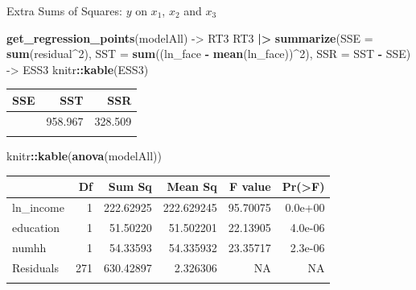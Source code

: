 \documentclass[
  ignorenonframetext,
]{beamer}
\newenvironment{Shaded}{\begin{snugshade}}{\end{snugshade}}
\newcommand{\AttributeTok}[1]{\textcolor[rgb]{0.13,0.29,0.53}{#1}}
\newcommand{\DecValTok}[1]{\textcolor[rgb]{0.00,0.00,0.81}{#1}}
\newcommand{\FunctionTok}[1]{\textcolor[rgb]{0.13,0.29,0.53}{\textbf{#1}}}
\newcommand{\NormalTok}[1]{#1}
\newcommand{\OtherTok}[1]{\textcolor[rgb]{0.56,0.35,0.01}{#1}}
\newcommand{\SpecialCharTok}[1]{\textcolor[rgb]{0.81,0.36,0.00}{\textbf{#1}}}
\begin{document}
\begin{frame}[fragile]{Extra Sums of Squares: \(y\) on \(x_1\), \(x_2\)
and \(x_3\)}
\label{extra-sums-of-squares-y-on-x_1-x_2-and-x_3-1}
\normalsize

\begin{Shaded}
\begin{Highlighting}[]
\FunctionTok{get\_regression\_points}\NormalTok{(modelAll) }\OtherTok{{-}\textgreater{}}\NormalTok{ RT3}
\NormalTok{RT3 }\SpecialCharTok{|\textgreater{}} 
  \FunctionTok{summarize}\NormalTok{(}\AttributeTok{SSE =} \FunctionTok{sum}\NormalTok{(residual}\SpecialCharTok{\^{}}\DecValTok{2}\NormalTok{), }
            \AttributeTok{SST =} \FunctionTok{sum}\NormalTok{((ln\_face }\SpecialCharTok{{-}} \FunctionTok{mean}\NormalTok{(ln\_face))}\SpecialCharTok{\^{}}\DecValTok{2}\NormalTok{),}
            \AttributeTok{SSR =}\NormalTok{ SST }\SpecialCharTok{{-}}\NormalTok{ SSE) }\OtherTok{{-}\textgreater{}}\NormalTok{ ESS3}
\NormalTok{knitr}\SpecialCharTok{::}\FunctionTok{kable}\NormalTok{(ESS3)}
\end{Highlighting}
\end{Shaded}

\begin{longtable}[]{@{}rrr@{}}
\toprule\noalign{}
SSE & SST & SSR \\
\midrule\noalign{}
\endhead
630.458 & 958.967 & 328.509 \\
\bottomrule\noalign{}
\end{longtable}

\begin{Shaded}
\begin{Highlighting}[]
\NormalTok{knitr}\SpecialCharTok{::}\FunctionTok{kable}\NormalTok{(}\FunctionTok{anova}\NormalTok{(modelAll))}
\end{Highlighting}
\end{Shaded}

\begin{longtable}[]{@{}lrrrrr@{}}
\toprule\noalign{}
& Df & Sum Sq & Mean Sq & F value & Pr(\textgreater F) \\
\midrule\noalign{}
\endhead
ln\_income & 1 & 222.62925 & 222.629245 & 95.70075 & 0.0e+00 \\
education & 1 & 51.50220 & 51.502201 & 22.13905 & 4.0e-06 \\
numhh & 1 & 54.33593 & 54.335932 & 23.35717 & 2.3e-06 \\
Residuals & 271 & 630.42897 & 2.326306 & NA & NA \\
\bottomrule\noalign{}
\end{longtable}

\normalsize
\end{frame}
\end{document}
